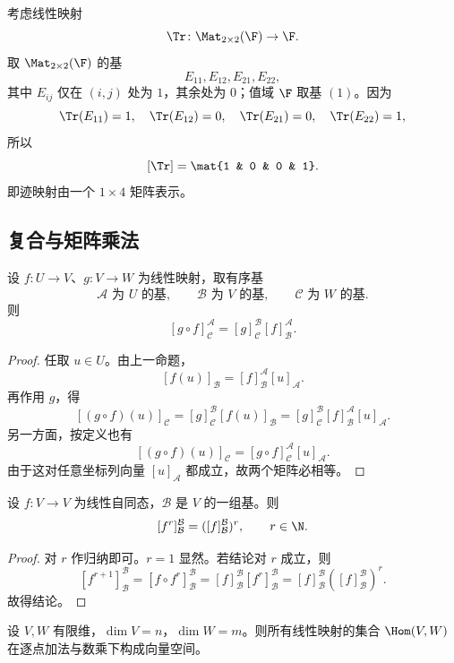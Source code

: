 \begin{example}[迹映射的矩阵]
考虑线性映射
\[
  \Tr\colon \Mat_{2\times 2}(\F)\to \F.
\]
取 $\Mat_{2\times 2}(\F)$ 的基
\[
  E_{11},E_{12},E_{21},E_{22},
\]
其中 $E_{ij}$ 仅在 $(i,j)$ 处为 $1$，其余处为 $0$；值域 $\F$ 取基 $(1)$。因为
\[
  \Tr(E_{11})=1,\quad \Tr(E_{12})=0,\quad \Tr(E_{21})=0,\quad \Tr(E_{22})=1,
\]
所以
\[
  [\Tr]=\mat{1 & 0 & 0 & 1}.
\]
即迹映射由一个 $1\times 4$ 矩阵表示。
\end{example}

\subsection{复合与矩阵乘法}

\begin{theorem}
设 $f\colon U\to V$、$g\colon V\to W$ 为线性映射，取有序基
\[
  \mathcal A\text{ 为 }U\text{ 的基},\qquad
  \mathcal B\text{ 为 }V\text{ 的基},\qquad
  \mathcal C\text{ 为 }W\text{ 的基}.
\]
则
\[
  [g\circ f]_{\mathcal C}^{\mathcal A}
  =[g]_{\mathcal C}^{\mathcal B}[f]_{\mathcal B}^{\mathcal A}.
\]
\end{theorem}

\begin{proof}
任取 $u\in U$。由上一命题，
\[
  [f(u)]_{\mathcal B}=[f]_{\mathcal B}^{\mathcal A}[u]_{\mathcal A}.
\]
再作用 $g$，得
\[
  [(g\circ f)(u)]_{\mathcal C}
  =[g]_{\mathcal C}^{\mathcal B}[f(u)]_{\mathcal B}
  =[g]_{\mathcal C}^{\mathcal B}[f]_{\mathcal B}^{\mathcal A}[u]_{\mathcal A}.
\]
另一方面，按定义也有
\[
  [(g\circ f)(u)]_{\mathcal C}
  =[g\circ f]_{\mathcal C}^{\mathcal A}[u]_{\mathcal A}.
\]
由于这对任意坐标列向量 $[u]_{\mathcal A}$ 都成立，故两个矩阵必相等。
\end{proof}

\begin{corollary}
设 $f\colon V\to V$ 为线性自同态，$\mathcal B$ 是 $V$ 的一组基。则
\[
  [f^r]_{\mathcal B}^{\mathcal B}=([f]_{\mathcal B}^{\mathcal B})^r,
  \qquad r\in\N.
\]
\end{corollary}

\begin{proof}
对 $r$ 作归纳即可。$r=1$ 显然。若结论对 $r$ 成立，则
\[
  [f^{r+1}]_{\mathcal B}^{\mathcal B}
  =[f\circ f^r]_{\mathcal B}^{\mathcal B}
  =[f]_{\mathcal B}^{\mathcal B}[f^r]_{\mathcal B}^{\mathcal B}
  =[f]_{\mathcal B}^{\mathcal B}([f]_{\mathcal B}^{\mathcal B})^r.
\]
故得结论。
\end{proof}

\begin{proposition}
设 $V,W$ 有限维，$\dim V=n$，$\dim W=m$。则所有线性映射的集合 $\Hom(V,W)$ 在逐点加法与数乘下构成向量空间。
\end{proposition}

